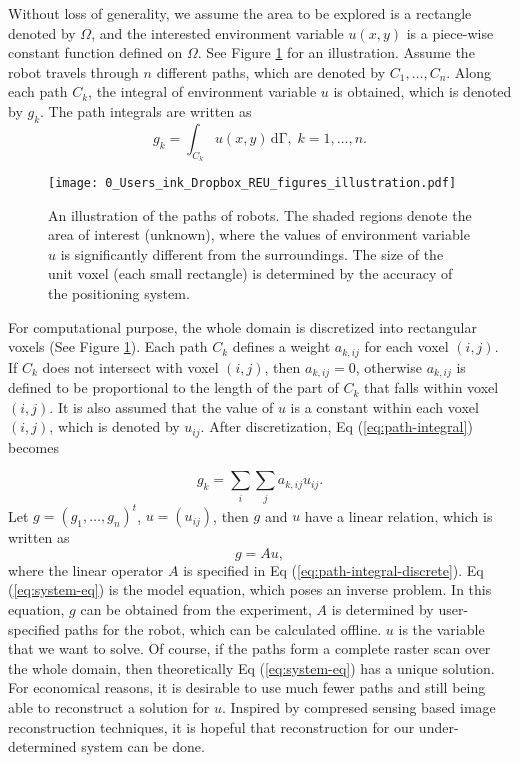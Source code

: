 \documentclass[english]{article}\usepackage[]{graphicx}\usepackage[]{color}
\begin{document}
Without loss of generality, we assume the area to be explored is a
rectangle denoted by $\Omega$, and the interested environment variable
$u(x,y)$ is a piece-wise constant function defined on $\Omega$.
See Figure \ref{fig:An-illustration-of-paths} for an illustration.
Assume the robot travels through $n$ different paths, which are denoted
by $C_{1},\ldots,C_{n}$. Along each path $C_{k}$, the integral of
environment variable $u$ is obtained, which is denoted by $g_{k}$.
The path integrals are written as
\begin{equation}
g_{k}=\int_{C_{k}}u(x,y)\mathrm{\,{d}\Gamma},\; k=1,\ldots,n.\label{eq:path-integral}
\end{equation}


\begin{figure}[h]
\begin{centering}
\texttt{[image: 0\_Users\_ink\_Dropbox\_REU\_figures\_illustration.pdf]}
\par\end{centering}

\caption{\label{fig:An-illustration-of-paths}An illustration of the paths
of robots. The shaded regions denote the area of interest (unknown),
where the values of environment variable $u$ is significantly different
from the surroundings. The size of the unit voxel (each small rectangle)
is determined by the accuracy of the positioning system.}
\end{figure}


For computational purpose, the whole domain is discretized into rectangular
voxels (See Figure \ref{fig:An-illustration-of-paths}). Each path
$C_{k}$ defines a weight $a_{k,ij}$ for each voxel $(i,j)$. If
$C_{k}$ does not intersect with voxel $(i,j)$, then $a_{k,ij}=0$,
otherwise $a_{k,ij}$ is defined to be proportional to the length
of the part of $C_{k}$ that falls within voxel $(i,j)$. It is also
assumed that the value of $u$ is a constant within each voxel $(i,j)$,
which is denoted by $u_{ij}$. After discretization, Eq (\ref{eq:path-integral})
becomes

\begin{equation}
g_{k}=\sum_{i}\sum_{j}a_{k,ij}u_{ij}.\label{eq:path-integral-discrete}
\end{equation}
Let $g=(g_{1},\ldots,g_{n})^{t}$, $u=(u_{ij})$, then $g$ and $u$
have a linear relation, which is written as 
\begin{equation}
g=Au,\label{eq:system-eq}
\end{equation}
where the linear operator $A$ is specified in Eq (\ref{eq:path-integral-discrete}).
Eq (\ref{eq:system-eq}) is the model equation, which poses an inverse
problem. In this equation, $g$ can be obtained from the experiment,
$A$ is determined by user-specified paths for the robot, which can
be calculated offline. $u$ is the variable that we want to solve.
Of course, if the paths form a complete raster scan over the whole
domain, then theoretically Eq (\ref{eq:system-eq}) has a unique solution.
For economical reasons, it is desirable to use much fewer paths and
still being able to reconstruct a solution for $u$. Inspired by compresed
sensing based image reconstruction techniques, it is hopeful that
reconstruction for our under-determined system can be done.
\end{document}
